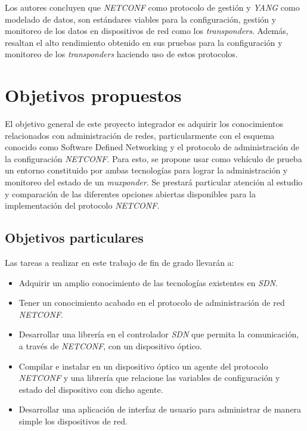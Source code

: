 Los autores concluyen que \textit{NETCONF} como protocolo de gestión y \textit{YANG} como modelado de datos, son estándares viables para la configuración, gestión y monitoreo de los datos en dispositivos de red como los \textit{transponders}. 
Además, resaltan el alto rendimiento obtenido en sus pruebas para la configuración y monitoreo de los \textit{transponders} haciendo uso de estos protocolos. 


\section{Objetivos propuestos}

El objetivo general de este proyecto integrador es adquirir los conocimientos relacionados con administración de redes, particularmente con el esquema conocido como Software Defined Networking y el protocolo de administración de la configuración \textit{NETCONF}. Para esto, se propone usar como vehículo de prueba un entorno constituido por ambas tecnologías para lograr la administración y monitoreo del estado de un \textit{muxponder}. Se prestará particular atención al estudio y comparación de las diferentes opciones abiertas disponibles para la implementación del protocolo \textit{NETCONF}.

\subsection{Objetivos particulares}

Las tareas a realizar en este trabajo de fin de grado llevarán a:


\begin{itemize}
    \item Adquirir un amplio conocimiento de las tecnologías existentes en \textit{SDN}.   
    \item Tener un conocimiento acabado en el protocolo de administración de red \textit{NETCONF}.   
    \item Desarrollar una librería en el controlador \textit{SDN} que permita la comunicación, a través de \textit{NETCONF}, con un dispositivo óptico.   
    \item Compilar e instalar en un dispositivo óptico un agente del protocolo \textit{NETCONF} y una librería que relacione las variables de configuración y estado del dispositivo con dicho agente.   
    \item Desarrollar una aplicación de interfaz de usuario para administrar de manera simple los dispositivos de red.
\end{itemize}  
    
